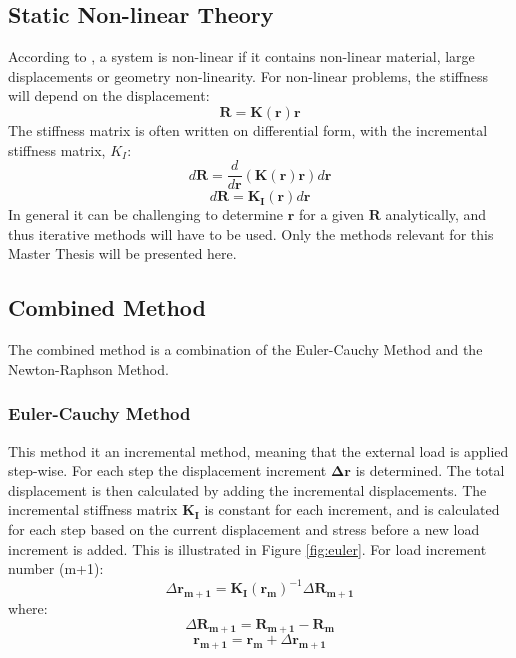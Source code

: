 \subsection{Static Non-linear Theory}
According to \cite{moan2003}, a system is non-linear if it contains non-linear material, large displacements or geometry non-linearity. For non-linear problems, the stiffness will depend on the displacement:
\begin{equation}
    \boldsymbol{R}=\boldsymbol{K(r)}\boldsymbol{r}
\end{equation}
The stiffness matrix is often written on differential form, with the incremental stiffness matrix, $K_I$:
\begin{equation}
    d\boldsymbol{R}=\frac{d}{d\boldsymbol{r}}(\boldsymbol{K(r)r})d\boldsymbol{r}
\end{equation}
\begin{equation}
  d\boldsymbol{R}= \boldsymbol{K_I(r)}d\boldsymbol{r}
  \label{eq:system}
\end{equation}
In general it can be challenging to determine $\boldsymbol{r}$ for a given $\boldsymbol{R}$ analytically, and thus iterative methods will have to be used. Only the methods relevant for this Master Thesis will be presented here. 

\subsection{Combined Method}
The combined method is a combination of the Euler-Cauchy Method and the Newton-Raphson Method. 
\subsubsection{Euler-Cauchy Method}
This method it an incremental method, meaning that the external load is applied step-wise. For each step the displacement increment $\boldsymbol{\Delta r}$ is determined. The total displacement is then calculated by adding the incremental displacements. The incremental stiffness matrix $\boldsymbol{K_I}$ is constant for each increment, and is calculated for each step based on the current displacement and stress before a new load increment is added. This is illustrated in Figure \ref{fig:euler}. For load increment number (m+1):
\begin{equation}
\Delta \boldsymbol{r_{m+1}}= \boldsymbol{K_{I}}(\boldsymbol{r_{m}})^{-1} \Delta \boldsymbol{R_{m+1}}
\end{equation}
\newline 
\newline
where:
\begin{equation}
    \Delta \boldsymbol{R_{m+1}} = \boldsymbol{R_{m+1}} - \boldsymbol{R_{m}}
\end{equation}
\begin{equation}
    \boldsymbol{r_{m+1}}=\boldsymbol{r_{m}}+\Delta \boldsymbol{r_{m+1}}
\end{equation}

